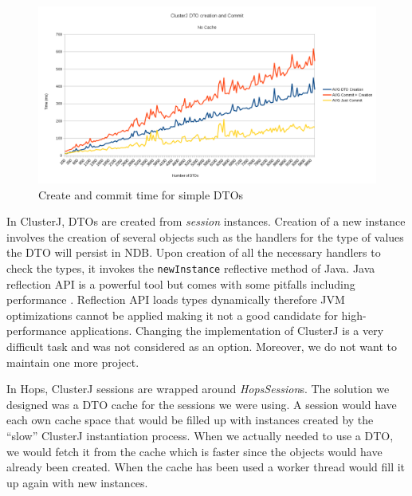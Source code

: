 \begin{figure}
\centering
\includegraphics[scale=0.55]{resources/images/Implementation/dto_create_commit_no_cache.png}
\caption{Create and commit time for simple DTOs}
\label{fig:impl_dto_no_cache}
\end{figure}

In ClusterJ, DTOs are created from \emph{session} instances. Creation
of a new instance involves the creation of several objects such as the
handlers for the type of values the DTO will persist in NDB. Upon creation
of all the necessary handlers to check the types, it invokes the
\texttt{newInstance} reflective method of Java. Java reflection API is
a powerful tool but comes with some pitfalls including
performance \cite{java_reflection}. Reflection API loads types dynamically therefore JVM
optimizations cannot be applied making it not a good candidate for
high-performance applications. Changing the implementation of ClusterJ
is a very difficult task and was not considered as an
option. Moreover, we do not want to maintain one more project.

In Hops, ClusterJ sessions are wrapped around \emph{HopsSession}s. The
solution we designed was a DTO cache for the sessions we were
using. A session would have each own cache space that would be filled
up with instances created by the ``slow'' ClusterJ instantiation
process. When we actually needed to use a DTO, we would fetch it from
the cache which is faster since the objects would have already been
created. When the cache has been used a worker thread would fill it up
again with new instances.